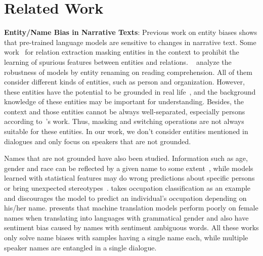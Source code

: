 \section{Related Work}

\textbf{Entity/Name Bias in Narrative Texts}: 
Previous work on entity biases shows that pre-trained language models are sensitive to changes in narrative text. Some work~\cite{zhang2018graph,zhang-etal-2017-position,wang-etal-2022-rely} for relation extraction masking entities in the context to prohibit the learning of spurious features between entities and relations.
~\citet{yan2022robustness} analyze the robustness of models by entity renaming on reading comprehension. All of them consider different kinds of entities, such as person and organization. However, these entities have the potential to be grounded in real life~\cite{smith2021hi}, and the background knowledge of these entities may be important for understanding. Besides, the context and those entities cannot be always well-separated, especially persons according to~\citet{yan2022robustness}'s work. Thus, masking and switching operations are not always suitable for these entities.
In our work, we don't consider entities mentioned in dialogues and only focus on speakers that are not grounded.  

Names that are not grounded have also been studied. Information such as age, gender and race can be reflected by a given name to some extent~\cite{girma2020black}, while models learned with statistical features may do wrong predictions about specific persons or bring unexpected stereotypes~\cite{bertrand2004emily}. \citet{romanov2019s} takes occupation classification as an example and discourages the model to predict an individual's occupation depending on his/her name. \citet{wang2022measuring} presents that machine translation models perform poorly on female names when translating into languages with grammatical gender and also have sentiment bias caused by names with sentiment ambiguous words. All these works only solve name biases with samples having a single name each, while multiple speaker names are entangled in a single dialogue.






